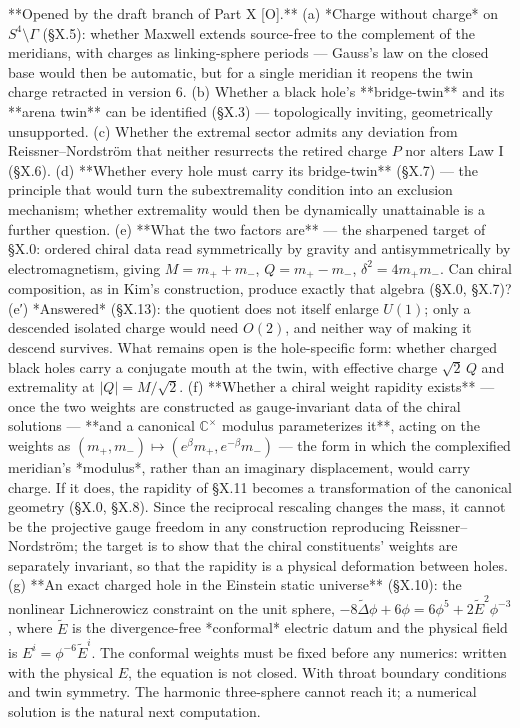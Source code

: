 **Opened by the draft branch of Part X [O].** (a) *Charge without charge* on $S^4\setminus\Gamma$ (§X.5): whether Maxwell extends source-free to the complement of the meridians, with charges as linking-sphere periods — Gauss's law on the closed base would then be automatic, but for a single meridian it reopens the twin charge retracted in version 6. (b) Whether a black hole's **bridge-twin** and its **arena twin** can be identified (§X.3) — topologically inviting, geometrically unsupported. (c) Whether the extremal sector admits any deviation from Reissner–Nordström that neither resurrects the retired charge $P$ nor alters Law I (§X.6). (d) **Whether every hole must carry its bridge-twin** (§X.7) — the principle that would turn the subextremality condition into an exclusion mechanism; whether extremality would then be dynamically unattainable is a further question. (e) **What the two factors are** — the sharpened target of §X.0: ordered chiral data read symmetrically by gravity and antisymmetrically by electromagnetism, giving $M = m_++m_-$, $Q = m_+-m_-$, $\delta^2 = 4m_+m_-$. Can chiral composition, as in Kim's construction, produce exactly that algebra (§X.0, §X.7)? (e′) *Answered* (§X.13): the quotient does not itself enlarge $U(1)$; only a descended isolated charge would need $O(2)$, and neither way of making it descend survives. What remains open is the hole-specific form: whether charged black holes carry a conjugate mouth at the twin, with effective charge $\sqrt2\,Q$ and extremality at $|Q| = M/\sqrt2$. (f) **Whether a chiral weight rapidity exists** — once the two weights are constructed as gauge-invariant data of the chiral solutions — **and a canonical $\mathbb{C}^\times$ modulus parameterizes it**, acting on the weights as $(m_+,m_-)\mapsto(e^\beta m_+,e^{-\beta}m_-)$ — the form in which the complexified meridian's *modulus*, rather than an imaginary displacement, would carry charge. If it does, the rapidity of §X.11 becomes a transformation of the canonical geometry (§X.0, §X.8). Since the reciprocal rescaling changes the mass, it cannot be the projective gauge freedom in any construction reproducing Reissner–Nordström; the target is to show that the chiral constituents' weights are separately invariant, so that the rapidity is a physical deformation between holes. (g) **An exact charged hole in the Einstein static universe** (§X.10): the nonlinear Lichnerowicz constraint on the unit sphere, $-8\tilde\Delta\phi+6\phi = 6\phi^5+2\tilde E^2\phi^{-3}$, where $\tilde E$ is the divergence-free *conformal* electric datum and the physical field is $E^i = \phi^{-6}\tilde E^i$. The conformal weights must be fixed before any numerics: written with the physical $E$, the equation is not closed. With throat boundary conditions and twin symmetry. The harmonic three-sphere cannot reach it; a numerical solution is the natural next computation.

